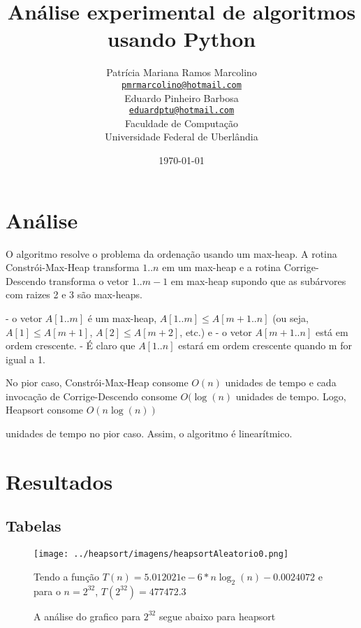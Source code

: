 \documentclass[12pt,a4paper,twoside]{report}
\title{Análise experimental de algoritmos usando Python}
\author{Patrícia Mariana Ramos Marcolino \\
\texttt{\small \url{pmrmarcolino@hotmail.com}}
\vspace{1cm} \\
Eduardo Pinheiro Barbosa \\
\texttt{\small \url{eduardptu@hotmail.com}}
\vspace{1cm} \\
Faculdade de Computação \\
Universidade Federal de Uberlândia
}
\date{\today}
\begin{document}
\maketitle
\listoffigures
\listoftables
\lstlistoflistings

\tableofcontents
\fancyhead[RE,LO]{\thesection}

\setlength{\parskip}{0.15in} %

\chapter{Análise}

O algoritmo resolve o problema da ordenação usando um max-heap.  A rotina Constrói-Max-Heap transforma $1..n$ em um max-heap e a rotina Corrige-Descendo transforma o vetor $1..m−1$ em max-heap supondo que as subárvores com raizes 2 e 3 são max-heaps.

- o vetor $A[1..m]$ é um max-heap,
$A[1..m]  \leq  A[m+1..n]$  (ou seja, $A[1] \leq A[m+1]$, $A[2] \leq A[m+2]$, etc.)  e
- o vetor $A[m+1..n]$ está em ordem crescente.
- É claro que $A[1..n]$ estará em ordem crescente quando m for igual a 1.

No pior caso, Constrói-Max-Heap consome $Ο(n)$ unidades de tempo e cada invocação de Corrige-Descendo consome $Ο(\log(n)$ unidades de tempo.  Logo, Heapsort consome $Ο(n\log(n))$

unidades de tempo no pior caso. Assim, o algoritmo é linearítmico.

\chapter{Resultados}
\section{Tabelas}



\begin{figure}[ht]
\centering \texttt{[image: ../heapsort/imagens/heapsortAleatorio0.png]}
\caption{A análise do grafico para $2^{32}$ segue abaixo para heapsort}

Tendo a função $T(n) = 5.012021\mathrm{e}-6*n\log_{2}(n)-0.0024072$ e para o $n =2^{32}$, $T(2^{32}) = 477472.3$
\label{fig:heapsortAleatorio0}
\end{figure}
\end{document}
